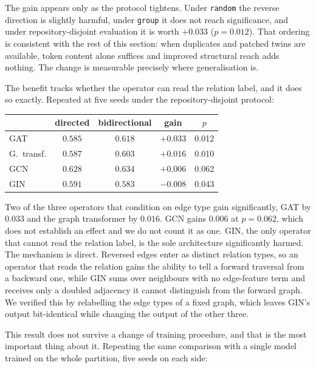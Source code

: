 The gain appears only as the protocol tightens. Under \texttt{random}
the reverse direction is slightly harmful, under \texttt{group} it does not
reach significance, and under repository-disjoint evaluation it is worth
$+0.033$ ($p=0.012$). That ordering is consistent with the rest of this section: when
duplicates and patched twins are available, token content alone suffices and
improved structural reach adds nothing. The change is measurable precisely where
generalisation is.

The benefit tracks whether the operator can read the relation label, and it
does so exactly. Repeated at five seeds under the repository-disjoint protocol:

\begin{center}
\small
\begin{tabular}{lcccc}
\toprule
& \textbf{directed} & \textbf{bidirectional} & \textbf{gain} & \textbf{$p$} \\
\midrule
GAT         & $0.585$ & $0.618$ & $+0.033$ & 0.012 \\
G.\ transf. & $0.587$ & $0.603$ & $+0.016$ & 0.010 \\
GCN         & $0.628$ & $0.634$ & $+0.006$ & 0.062 \\
\midrule
GIN         & $0.591$ & $0.583$ & $-0.008$ & 0.043 \\
\bottomrule
\end{tabular}
\end{center}

\noindent Two of the three operators that condition on edge type gain
significantly, GAT by $0.033$ and the graph transformer by $0.016$. GCN gains
$0.006$ at $p=0.062$, which does not establish an effect and we do not count it
as one. GIN, the only operator that cannot read the relation label, is the sole
architecture significantly harmed. The mechanism is direct.
Reversed edges enter as distinct relation types, so an operator that reads the
relation gains the ability to tell a forward traversal from a backward one,
while GIN sums over neighbours with no edge-feature term and receives only a
doubled adjacency it cannot distinguish from the forward graph. We verified
this by relabelling the edge types of a fixed graph, which leaves GIN's output
bit-identical while changing the output of the other three.

This result does not survive a change of training procedure, and that is the
most important thing about it. Repeating the same comparison with a single
model trained on the whole partition, five seeds on each side:

